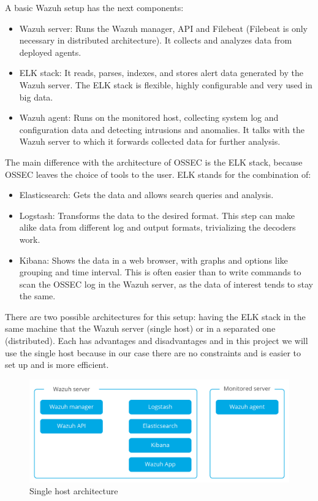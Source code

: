A basic Wazuh setup has the next components\cite{wazuh_architecture}:
\begin{itemize}
	\item Wazuh server: Runs the Wazuh manager, API and Filebeat (Filebeat is only necessary in distributed architecture). It collects and analyzes data from deployed agents.
	\item ELK stack: It reads, parses, indexes, and stores alert data generated by the Wazuh server. The ELK stack is flexible, highly configurable and very used in big data.
	\item Wazuh agent: Runs on the monitored host, collecting system log and configuration data and detecting intrusions and anomalies. It talks with the Wazuh server to which it forwards collected data for further analysis.
\end{itemize}
\linej
The main difference with the architecture of OSSEC is the ELK stack, because OSSEC leaves the choice of tools to the user. ELK stands for the combination of:
\begin{itemize}
	\item Elasticsearch: Gets the data and allows search queries and analysis.
	\item Logstash: Transforms the data to the desired format. This step can make alike data from different log and output formats, trivializing the decoders work.
	\item Kibana: Shows the data in a web browser, with graphs and options like grouping and time interval. This is often easier than to write commands to scan the OSSEC log in the Wazuh server, as the data of interest tends to stay the same.
\end{itemize}
\linej
\label{singlehost}
There are two possible architectures for this setup: having the ELK stack in the same machine that the Wazuh server (single host) or in a separated one (distributed). Each has advantages and disadvantages and in this project we will use the single host because in our case there are no constraints and is easier to set up and is more efficient.
\begin{figure}[H]
  \centering
	\includegraphics[width=\textwidth]{figuras/wazuh_singlehost.png}
	\caption{Single host architecture}
\end{figure}


